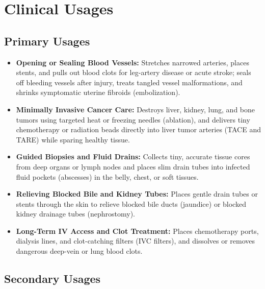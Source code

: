 \section{Clinical Usages}

\subsection{Primary Usages}

\begin{itemize}
    \item \textbf{Opening or Sealing Blood Vessels:} Stretches narrowed arteries, places stents, and pulls out blood clots for leg-artery disease or acute stroke; seals off bleeding vessels after injury, treats tangled vessel malformations, and shrinks symptomatic uterine fibroids (embolization).
    \item \textbf{Minimally Invasive Cancer Care:} Destroys liver, kidney, lung, and bone tumors using targeted heat or freezing needles (ablation), and delivers tiny chemotherapy or radiation beads directly into liver tumor arteries (TACE and TARE) while sparing healthy tissue.
    \item \textbf{Guided Biopsies and Fluid Drains:} Collects tiny, accurate tissue cores from deep organs or lymph nodes and places slim drain tubes into infected fluid pockets (abscesses) in the belly, chest, or soft tissues.
    \item \textbf{Relieving Blocked Bile and Kidney Tubes:} Places gentle drain tubes or stents through the skin to relieve blocked bile ducts (jaundice) or blocked kidney drainage tubes (nephrostomy).
    \item \textbf{Long-Term IV Access and Clot Treatment:} Places chemotherapy ports, dialysis lines, and clot-catching filters (IVC filters), and dissolves or removes dangerous deep-vein or lung blood clots.
\end{itemize}

\subsection{Secondary Usages}


